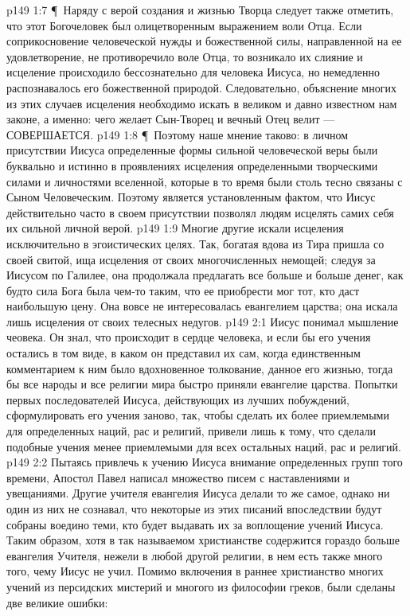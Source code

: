 \vs p149 1:7 \P\ \bibnobreakspace Наряду с верой создания и жизнью Творца следует также отметить, что этот Богочеловек был олицетворенным выражением воли Отца. Если соприкосновение человеческой нужды и божественной силы, направленной на ее удовлетворение, не противоречило воле Отца, то возникало их слияние и исцеление происходило бессознательно для человека Иисуса, но немедленно распознавалось его божественной природой. Следовательно, объяснение многих из этих случаев исцеления необходимо искать в великом и давно известном нам законе, а именно: чего желает Сын\hyp{}Творец и вечный Отец велит --- СОВЕРШАЕТСЯ.
\vs p149 1:8 \P\ Поэтому наше мнение таково: в личном присутствии Иисуса определенные формы сильной человеческой веры были буквально и истинно  в проявлениях исцеления определенными творческими силами и личностями вселенной, которые в то время были столь тесно связаны с Сыном Человеческим. Поэтому является установленным фактом, что Иисус действительно часто в своем присутствии позволял людям исцелять самих себя их сильной личной верой.
\vs p149 1:9 Многие другие искали исцеления исключительно в эгоистических целях. Так, богатая вдова из Тира пришла со своей свитой, ища исцеления от своих многочисленных немощей; следуя за Иисусом по Галилее, она продолжала предлагать все больше и больше денег, как будто сила Бога была чем\hyp{}то таким, что ее приобрести мог тот, кто даст наибольшую цену. Она вовсе не интересовалась евангелием царства; она искала лишь исцеления от своих телесных недугов.
\vs p149 2:1 Иисус понимал мышление чеовека. Он знал, что происходит в сердце человека, и если бы его учения остались в том виде, в каком он представил их сам, когда единственным комментарием к ним было вдохновенное толкование, данное его жизнью, тогда бы все народы и все религии мира быстро приняли евангелие царства. Попытки первых последователей Иисуса, действующих из лучших побуждений, сформулировать его учения заново, так, чтобы сделать их более приемлемыми для определенных наций, рас и религий, привели лишь к тому, что сделали подобные учения менее приемлемыми для всех остальных наций, рас и религий.
\vs p149 2:2 Пытаясь привлечь к учению Иисуса внимание определенных групп того времени, Апостол Павел написал множество писем с наставлениями и увещаниями. Другие учителя евангелия Иисуса делали то же самое, однако ни один из них не сознавал, что некоторые из этих писаний впоследствии будут собраны воедино теми, кто будет выдавать их за воплощение учений Иисуса. Таким образом, хотя в так называемом христианстве содержится гораздо больше евангелия Учителя, нежели в любой другой религии, в нем есть также много того, чему Иисус не учил. Помимо включения в раннее христианство многих учений из персидских мистерий и многого из философии греков, были сделаны две великие ошибки:
